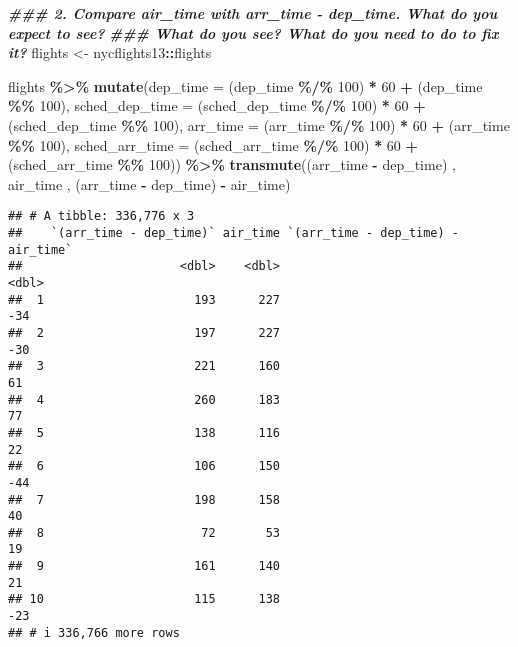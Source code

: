 \documentclass[
]{article}
\newenvironment{Shaded}{\begin{snugshade}}{\end{snugshade}}
\newcommand{\AttributeTok}[1]{\textcolor[rgb]{0.13,0.29,0.53}{#1}}
\newcommand{\DecValTok}[1]{\textcolor[rgb]{0.00,0.00,0.81}{#1}}
\newcommand{\DocumentationTok}[1]{\textcolor[rgb]{0.56,0.35,0.01}{\textbf{\textit{#1}}}}
\newcommand{\FunctionTok}[1]{\textcolor[rgb]{0.13,0.29,0.53}{\textbf{#1}}}
\newcommand{\NormalTok}[1]{#1}
\newcommand{\OtherTok}[1]{\textcolor[rgb]{0.56,0.35,0.01}{#1}}
\newcommand{\SpecialCharTok}[1]{\textcolor[rgb]{0.81,0.36,0.00}{\textbf{#1}}}
\begin{document}
\begin{Shaded}
\begin{Highlighting}[]
\DocumentationTok{\#\#\# 2. Compare \textasciigrave{}air\_time\textasciigrave{} with \textasciigrave{}arr\_time {-} dep\_time\textasciigrave{}. What do you expect to see?}
\DocumentationTok{\#\#\# What do you see? What do you need to do to fix it?}
\NormalTok{flights }\OtherTok{\textless{}{-}}\NormalTok{ nycflights13}\SpecialCharTok{::}\NormalTok{flights}

\NormalTok{flights }\SpecialCharTok{\%\textgreater{}\%} 
  \FunctionTok{mutate}\NormalTok{(}\AttributeTok{dep\_time =}\NormalTok{ (dep\_time }\SpecialCharTok{\%/\%} \DecValTok{100}\NormalTok{) }\SpecialCharTok{*} \DecValTok{60} \SpecialCharTok{+}\NormalTok{ (dep\_time }\SpecialCharTok{\%\%} \DecValTok{100}\NormalTok{),}
         \AttributeTok{sched\_dep\_time =}\NormalTok{ (sched\_dep\_time }\SpecialCharTok{\%/\%} \DecValTok{100}\NormalTok{) }\SpecialCharTok{*} \DecValTok{60} \SpecialCharTok{+}\NormalTok{ (sched\_dep\_time }\SpecialCharTok{\%\%} \DecValTok{100}\NormalTok{),}
         \AttributeTok{arr\_time =}\NormalTok{ (arr\_time }\SpecialCharTok{\%/\%} \DecValTok{100}\NormalTok{) }\SpecialCharTok{*} \DecValTok{60} \SpecialCharTok{+}\NormalTok{ (arr\_time }\SpecialCharTok{\%\%} \DecValTok{100}\NormalTok{),}
         \AttributeTok{sched\_arr\_time =}\NormalTok{ (sched\_arr\_time }\SpecialCharTok{\%/\%} \DecValTok{100}\NormalTok{) }\SpecialCharTok{*} \DecValTok{60} \SpecialCharTok{+}\NormalTok{ (sched\_arr\_time }\SpecialCharTok{\%\%} \DecValTok{100}\NormalTok{)) }\SpecialCharTok{\%\textgreater{}\%}
  \FunctionTok{transmute}\NormalTok{((arr\_time }\SpecialCharTok{{-}}\NormalTok{ dep\_time) ,}
\NormalTok{            air\_time ,}
\NormalTok{            (arr\_time }\SpecialCharTok{{-}}\NormalTok{ dep\_time)  }\SpecialCharTok{{-}}\NormalTok{ air\_time)}
\end{Highlighting}
\end{Shaded}

\begin{verbatim}
## # A tibble: 336,776 x 3
##    `(arr_time - dep_time)` air_time `(arr_time - dep_time) - air_time`
##                      <dbl>    <dbl>                              <dbl>
##  1                     193      227                                -34
##  2                     197      227                                -30
##  3                     221      160                                 61
##  4                     260      183                                 77
##  5                     138      116                                 22
##  6                     106      150                                -44
##  7                     198      158                                 40
##  8                      72       53                                 19
##  9                     161      140                                 21
## 10                     115      138                                -23
## # i 336,766 more rows
\end{verbatim}
\end{document}
